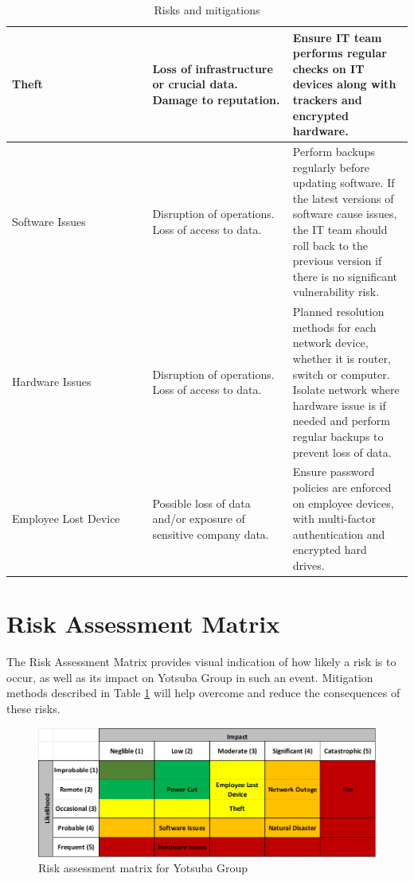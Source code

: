 \begin{table}[H]
\begin{tabular}{|p{0.35\linewidth}|p{0.35\linewidth}|p{0.35\linewidth}|}
    Theft                                                & Loss of infrastructure or crucial data. Damage to reputation.                                                & Ensure IT team performs regular checks on IT devices along with trackers and encrypted hardware.                                                                                                                                   \\ \hline
    Software Issues                                      & Disruption of operations. Loss of access to data.                                                            & Perform backups regularly before updating software. If the latest versions of software cause issues, the IT team should roll back to the previous version if there is no significant vulnerability risk.                           \\ \hline
    Hardware Issues                                      & Disruption of operations. Loss of access to data.                                                            & Planned resolution methods for each network device, whether it is router, switch or computer. Isolate network where hardware issue is if needed and perform regular backups to prevent loss of data.                               \\ \hline
    Employee Lost Device                                 & Possible loss of data and/or exposure of sensitive company data.                                             & Ensure password policies are enforced on employee devices, with multi-factor authentication and encrypted hard drives.                                                                                                             \\ \hline
    \end{tabular}
    \caption{Risks and mitigations}
    \label{tab:risks_mitigations}
\end{table}

\section{Risk Assessment Matrix}

The Risk Assessment Matrix provides visual indication of how likely a risk is to occur, as well as its impact on Yotsuba Group in such an event. Mitigation methods described in Table \ref{tab:risks_mitigations} will help overcome and reduce the consequences of these risks.

\begin{figure}[H]
    \centering
    \includegraphics[width=15cm]{Figures/risk_assessment_matrix.png}
    \caption{Risk assessment matrix for Yotsuba Group}
    \label{fig: table}
\end{figure}